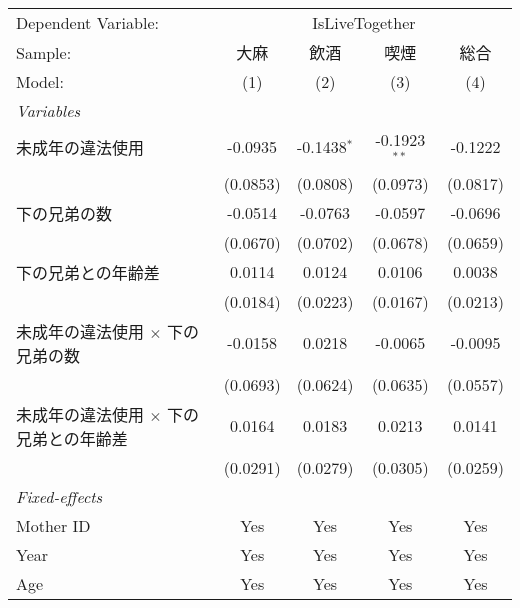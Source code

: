 \documentclass{article}
\begin{document}
\begingroup
\centering
\begin{threeparttable}[b]
   \begin{tabular}{lcccc}
      \tabularnewline \midrule \midrule
      Dependent Variable: & \multicolumn{4}{c}{IsLiveTogether}\\
      Sample:                                       & 大麻     & 飲酒          & 喫煙           & 総合 \\   
      Model:                                        & (1)      & (2)           & (3)            & (4)\\  
      \midrule
      \emph{Variables}\\
      未成年の違法使用                              & -0.0935  & -0.1438$^{*}$ & -0.1923$^{**}$ & -0.1222\\   
                                                    & (0.0853) & (0.0808)      & (0.0973)       & (0.0817)\\   
      下の兄弟の数                                  & -0.0514  & -0.0763       & -0.0597        & -0.0696\\   
                                                    & (0.0670) & (0.0702)      & (0.0678)       & (0.0659)\\   
      下の兄弟との年齢差                            & 0.0114   & 0.0124        & 0.0106         & 0.0038\\   
                                                    & (0.0184) & (0.0223)      & (0.0167)       & (0.0213)\\   
      未成年の違法使用 $\times$ 下の兄弟の数        & -0.0158  & 0.0218        & -0.0065        & -0.0095\\   
                                                    & (0.0693) & (0.0624)      & (0.0635)       & (0.0557)\\   
      未成年の違法使用 $\times$ 下の兄弟との年齢差  & 0.0164   & 0.0183        & 0.0213         & 0.0141\\   
                                                    & (0.0291) & (0.0279)      & (0.0305)       & (0.0259)\\   
      \midrule
      \emph{Fixed-effects}\\
      Mother ID                                     & Yes      & Yes           & Yes            & Yes\\  
      Year                                          & Yes      & Yes           & Yes            & Yes\\  
      Age                                           & Yes      & Yes           & Yes            & Yes\\  

\end{tabular}
\end{threeparttable}
\end{document}
